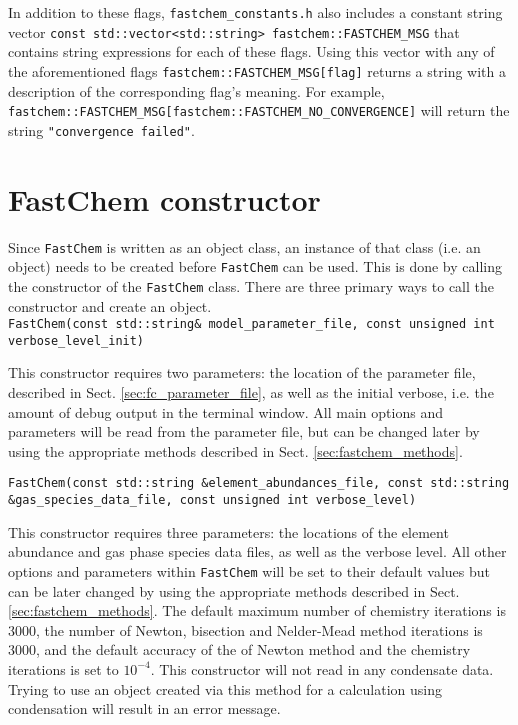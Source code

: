 \documentclass[numbers=noenddot]{aux/fcmanual}
\newcommand{\fc}{\texttt{FastChem}\xspace}
\begin{document}
\bigbreak

In addition to these flags, \verb|fastchem_constants.h| also includes a constant string vector \lstinline!const std::vector<std::string> fastchem::FASTCHEM_MSG! that contains string expressions for each of these flags. Using this vector with any of the aforementioned flags \lstinline!fastchem::FASTCHEM_MSG[flag]! returns a string with a description of the corresponding flag's meaning. For example, \lstinline!fastchem::FASTCHEM_MSG[fastchem::FASTCHEM_NO_CONVERGENCE]! will return the string \lstinline!"convergence failed"!.


\section{FastChem constructor}

Since \fc is written as an object class, an instance of that class (i.e. an object) needs to be created before \fc can be used. This is done by calling the constructor of the \fc class. There are three primary ways to call the constructor and create an object.\\

\lstinline!FastChem(const std::string& model_parameter_file, const unsigned int verbose_level_init)!
\begin{addmargin}[25pt]{0pt}
  This constructor requires two parameters: the location of the parameter file, described in Sect. \ref{sec:fc_parameter_file}, as well as the initial verbose, i.e. the amount of debug output in the terminal window. All main options and parameters will be read from the parameter file, but can be changed later by using the appropriate methods described in Sect. \ref{sec:fastchem_methods}.
\end{addmargin}

\bigbreak

\lstinline[breaklines=true]!FastChem(const std::string &element_abundances_file, const std::string &gas_species_data_file, const unsigned int verbose_level)!
\begin{addmargin}[25pt]{0pt}
  This constructor requires three parameters: the locations of the element abundance and gas phase species data files, as well as the verbose level. All other options and parameters within \fc will be set to their default values but can be later changed by using the appropriate methods described in Sect. \ref{sec:fastchem_methods}. The default maximum number of chemistry iterations is 3000, the number of Newton, bisection and Nelder-Mead method iterations is 3000, and the default accuracy of the of Newton method and the chemistry iterations is set to $10^{-4}$. This constructor will not read in any condensate data. Trying to use an object created via this method for a calculation using condensation will result in an error message.
\end{addmargin}
\end{document}
